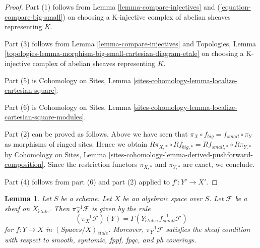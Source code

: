 \documentclass{stacks-project}
\theoremstyle{plain}
\newtheorem{lemma}[subsection]{Lemma}
\theoremstyle{definition}
\theoremstyle{remark}
\numberwithin{equation}{subsection}
\def\etale{{\acute{e}tale}}
\begin{document}
\begin{proof}
Part (1) follows from
Lemma \ref{lemma-compare-injectives}
and (\ref{equation-compare-big-small})
on choosing a K-injective complex of abelian sheaves representing $K$.

\medskip\noindent
Part (3) follows from Lemma \ref{lemma-compare-injectives}
and Topologies, Lemma
\ref{topologies-lemma-morphism-big-small-cartesian-diagram-etale}
on choosing a K-injective complex of abelian sheaves representing $K$.

\medskip\noindent
Part (5) is Cohomology on Sites, Lemma
\ref{sites-cohomology-lemma-localize-cartesian-square}.

\medskip\noindent
Part (6) is  Cohomology on Sites, Lemma
\ref{sites-cohomology-lemma-localize-cartesian-square-modules}.

\medskip\noindent
Part (2) can be proved as follows. Above we have seen
that $\pi_X \circ f_{big} = f_{small} \circ \pi_Y$ as morphisms
of ringed sites. Hence we obtain
$R\pi_{X, *} \circ Rf_{big, *} = Rf_{small, *} \circ R\pi_{Y, *}$
by Cohomology on Sites, Lemma
\ref{sites-cohomology-lemma-derived-pushforward-composition}.
Since the restriction functors $\pi_{X, *}$ and $\pi_{Y, *}$
are exact, we conclude.

\medskip\noindent
Part (4) follows from part (6) and part (2) applied to $f' : Y' \to X'$.
\end{proof}

\begin{lemma}
\label{lemma-describe-pullback}
Let $S$ be a scheme. Let $X$ be an algebraic space over $S$.
Let $\mathcal{F}$ be a sheaf on $X_\etale$. Then
$\pi_X^{-1}\mathcal{F}$ is given by the rule
$$
(\pi_X^{-1}\mathcal{F})(Y) = \Gamma(Y_\etale, f_{small}^{-1}\mathcal{F})
$$
for $f : Y \to X$ in $(\textit{Spaces}/X)_\etale$.
Moreover, $\pi_Y^{-1}\mathcal{F}$ satisfies the
sheaf condition with respect to smooth, syntomic, fppf, fpqc, and ph coverings.
\end{lemma}
\end{document}
